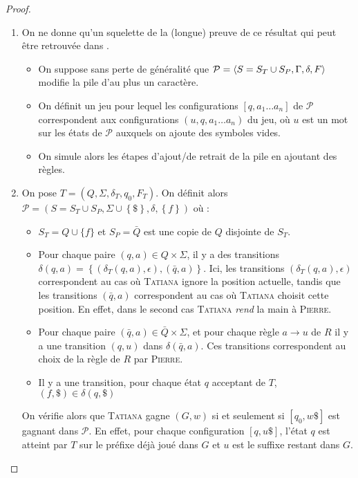 \documentclass{cours}
\begin{document}
\begin{proof}
    \begin{enumerate}
        \item On ne donne qu'un squelette de la (longue) preuve de ce résultat qui peut être retrouvée dans \cite{cfgames}. 
        \begin{itemize}
            \item On suppose sans perte de généralité que $\mathcal{P} = \left\langle S = S_{T} \cup S_{P}, \Gamma, \delta, F \right\rangle$ modifie la pile d'au plus un caractère. 
            \item On définit un jeu pour lequel les configurations $\left[q, a_{1}\ldots a_{n}\right]$ de $\mathcal{P}$ correspondent aux configurations $\left(u, \boxed{q, a_{1}}\ldots a_{n}\right)$ du jeu, où $u$ est un mot sur les états de $\mathcal{P}$ auxquels on ajoute des symboles vides.
            \item On simule alors les étapes d'ajout/de retrait de la pile en ajoutant des règles. 
        \end{itemize}
        \item On pose $T = \left(Q, \Sigma, \delta_{T}, q_{0}, F_{T}\right)$. On définit alors $\mathcal{P} = \left(S = S_{T} \cup S_{P}, \Sigma \cup \left\{\$\right\}, \delta, \left\{f\right\}\right)$ où : 
        \begin{itemize}
            \item $S_{T} = Q \cup \{f\}$ et $S_{P} = \bar{Q}$ est une copie de $Q$ disjointe de $S_{T}$.
            \item Pour chaque paire $(q, a) \in Q \times \Sigma$, il y a des transitions $\delta(q, a) = \left\{\left(\delta_{T}(q, a), \epsilon\right), \left(\bar{q}, a\right)\right\}$. Ici, les transitions $\left(\delta_{T}(q, a), \epsilon\right)$ correspondent au cas où \textsc{Tatiana} ignore la position actuelle, tandis que les transitions $(\bar{q}, a)$ correspondent au cas où \textsc{Tatiana} choisit cette position. En effet, dans le second cas \textsc{Tatiana} \textit{rend} la main à \textsc{Pierre}.
            \item Pour chaque paire $(\bar{q}, a) \in \bar{Q} \times \Sigma$, et pour chaque règle $a \rightarrow u$ de $R$ il y a une transition $\left(q, u\right)$ dans $\delta(\bar{q}, a)$. Ces transitions correspondent au choix de la règle de $R$ par \textsc{Pierre}.
            \item Il y a une transition, pour chaque état $q$ acceptant de $T$, $\left(f, \$\right) \in \delta(q, \$)$
        \end{itemize}
        On vérifie alors que \textsc{Tatiana} gagne $\left(G, w\right)$ si et seulement si $\left[q_{0}, w\$\right]$ est gagnant dans $\mathcal{P}$. En effet, pour chaque configuration $\left[q, u\$\right]$, l'état $q$ est atteint par $T$ sur le préfixe déjà joué dans $G$ et $u$ est le suffixe restant dans $G$.
    \end{enumerate}
\end{proof}
\end{document}
